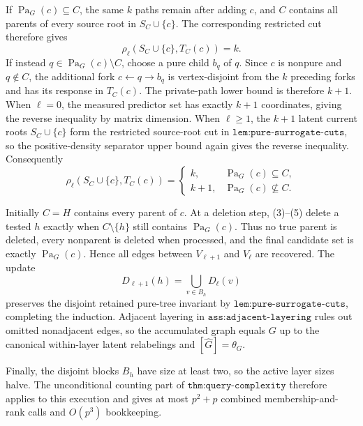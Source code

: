If \(\operatorname{Pa}_G(c)\subseteq C\), the same \(k\) paths remain after adding \(c\), and \(C\) contains all parents of every source root in \(S_C\cup\{c\}\).  The corresponding restricted cut therefore gives
\[
 \rho_\ell(S_C\cup\{c\},T_C(c))=k. \tag{4}
\]
If instead \(q\in\operatorname{Pa}_G(c)\setminus C\), choose a pure child \(b_q\) of \(q\).  Since \(c\) is nonpure and \(q\notin C\), the additional fork \(c\leftarrow q\to b_q\) is vertex-disjoint from the \(k\) preceding forks and has its response in \(T_C(c)\).  The private-path lower bound is therefore \(k+1\).  When \(\ell=0\), the measured predictor set has exactly \(k+1\) coordinates, giving the reverse inequality by matrix dimension.  When \(\ell\geq1\), the \(k+1\) latent current roots \(S_C\cup\{c\}\) form the restricted source-root cut in \(\texttt{lem:pure-surrogate-cuts}\), so the positive-density separator upper bound again gives the reverse inequality.  Consequently
\[
 \rho_\ell(S_C\cup\{c\},T_C(c))=
 \begin{cases}
 k,&\operatorname{Pa}_G(c)\subseteq C,\\
 k+1,&\operatorname{Pa}_G(c)\nsubseteq C.
 \end{cases} \tag{5}
\]

Initially \(C=H\) contains every parent of \(c\).  At a deletion step, (3)--(5) delete a tested \(h\) exactly when \(C\setminus\{h\}\) still contains \(\operatorname{Pa}_G(c)\).  Thus no true parent is deleted, every nonparent is deleted when processed, and the final candidate set is exactly \(\operatorname{Pa}_G(c)\).  Hence all edges between \(V_{\ell+1}\) and \(V_\ell\) are recovered.  The update
\[
 D_{\ell+1}(h)=\bigcup_{v\in B_h}D_\ell(v)
\]
preserves the disjoint retained pure-tree invariant by \(\texttt{lem:pure-surrogate-cuts}\), completing the induction.  Adjacent layering in \(\texttt{ass:adjacent-layering}\) rules out omitted nonadjacent edges, so the accumulated graph equals \(G\) up to the canonical within-layer latent relabelings and \([\widehat G]=\theta_G\).

Finally, the disjoint blocks \(B_h\) have size at least two, so the active layer sizes halve.  The unconditional counting part of \(\texttt{thm:query-complexity}\) therefore applies to this execution and gives at most \(p^2+p\) combined membership-and-rank calls and \(O(p^3)\) bookkeeping.

